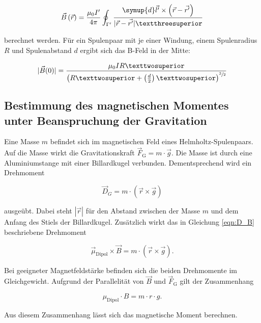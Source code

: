 \begin{equation*}
    \vec{B}\left(\vec{r}\right) = \frac{\mu_{0}I'}{4\pi}\oint_{\Gamma'} \frac{\symup{d}\vec{l'} \times \left(\vec{r} - \vec{r'}\right)}{| \vec{r} - \vec{r'} |³}
\end{equation*}

\noindent berechnet werden. Für ein Spulenpaar mit je einer Windung, einem Spulenradius $R$ und Spulenabstand $d$ ergibt sich das B-Feld in der Mitte:

\begin{equation}
\label{eqn:B0}
    | \vec{B}(0) | = \frac{\mu_{0}IR²}{\left(R²+\left(\frac{d}{2}\right)²\right)^{\sfrac{3}{2}}}
\end{equation}

\subsection{Bestimmung des magnetischen Momentes unter Beanspruchung der Gravitation}

\noindent Eine Masse $m$ befindet sich im magnetischen Feld eines Helmholtz-Spulenpaars. Auf die Masse wirkt die Gravitationskraft 
$\vec{F}_\text{G} = m \cdot \vec{g}$. Die Masse ist durch eine Aluminiumstange mit einer Billardkugel verbunden. Dementsprechend 
wird ein Drehmoment 

\begin{equation*}
    \vec{D}_{G} = m \cdot \left(\vec{r} \times \vec{g}\right)
\end{equation*}

\noindent ausgeübt. Dabei steht $| \vec{r} |$ für den Abstand zwischen der Masse $m$ und dem Anfang des Stiels der Billardkugel.
Zusätzlich wirkt das in Gleichung \eqref{eqn:D_B} beschriebene Drehmoment 

\begin{equation*}
    \vec{\mu}_\text{Dipol} \times \vec{B} = m \cdot \left(\vec{r} \times \vec{g}\right).
\end{equation*}

\noindent Bei geeigneter Magnetfeldstärke befinden sich die beiden Drehmomente im Gleichgewicht. Aufgrund der Parallelität von $\vec{B}$ und
$\vec{F}_\text{G}$ gilt der Zusammenhang

\begin{equation}
\label{eqn:Gravitation}
    \mu_\text{Dipol} \cdot B = m \cdot r \cdot g.
\end{equation}

\noindent Aus diesem Zusammenhang lässt sich das magnetische Moment berechnen.

